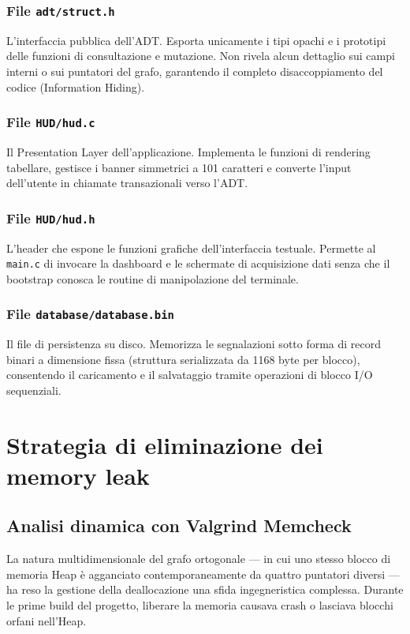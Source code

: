 \documentclass[12pt, a4paper]{article}
\begin{document}
\subsubsection{File \texttt{adt/struct.h}}
L'interfaccia pubblica dell'ADT. Esporta unicamente i tipi opachi e i prototipi delle funzioni di consultazione e mutazione. Non rivela alcun dettaglio sui campi interni o sui puntatori del grafo, garantendo il completo disaccoppiamento del codice (Information Hiding).

\subsubsection{File \texttt{HUD/hud.c}}
Il Presentation Layer dell'applicazione. Implementa le funzioni di rendering tabellare, gestisce i banner simmetrici a 101 caratteri e converte l'input dell'utente in chiamate transazionali verso l'ADT.

\subsubsection{File \texttt{HUD/hud.h}}
L'header che espone le funzioni grafiche dell'interfaccia testuale. Permette al \texttt{main.c} di invocare la dashboard e le schermate di acquisizione dati senza che il bootstrap conosca le routine di manipolazione del terminale.

\subsubsection{File \texttt{database/database.bin}}
Il file di persistenza su disco. Memorizza le segnalazioni sotto forma di record binari a dimensione fissa (struttura serializzata da 1168 byte per blocco), consentendo il caricamento e il salvataggio tramite operazioni di blocco I/O sequenziali.

\section{Strategia di eliminazione dei memory leak}

\subsection{Analisi dinamica con Valgrind Memcheck}
La natura multidimensionale del grafo ortogonale --- in cui uno stesso blocco di memoria Heap è agganciato contemporaneamente da quattro puntatori diversi --- ha reso la gestione della deallocazione una sfida ingegneristica complessa. Durante le prime build del progetto, liberare la memoria causava crash o lasciava blocchi orfani nell'Heap.
\end{document}
